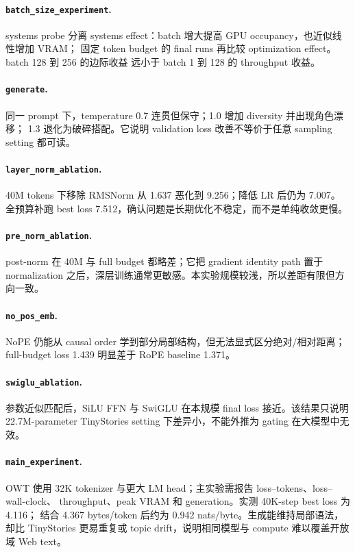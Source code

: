 \paragraph{\texttt{batch\_size\_experiment}.}
systems probe 分离 systems effect：batch 增大提高 GPU occupancy，也近似线性增加 VRAM；
固定 token budget 的 final runs 再比较 optimization effect。batch 128 到 256 的边际收益
远小于 batch 1 到 128 的 throughput 收益。

\paragraph{\texttt{generate}.}
同一 prompt 下，temperature 0.7 连贯但保守；1.0 增加 diversity 并出现角色漂移；
1.3 退化为破碎搭配。它说明 validation loss 改善不等价于任意 sampling setting 都可读。

\paragraph{\texttt{layer\_norm\_ablation}.}
40M tokens 下移除 RMSNorm 从 1.637 恶化到 9.256；降低 LR 后仍为 7.007。
全预算补跑 best loss 7.512，确认问题是长期优化不稳定，而不是单纯收敛更慢。

\paragraph{\texttt{pre\_norm\_ablation}.}
post-norm 在 40M 与 full budget 都略差；它把 gradient identity path 置于 normalization
之后，深层训练通常更敏感。本实验规模较浅，所以差距有限但方向一致。

\paragraph{\texttt{no\_pos\_emb}.}
NoPE 仍能从 causal order 学到部分局部结构，但无法显式区分绝对/相对距离；
full-budget loss 1.439 明显差于 RoPE baseline 1.371。

\paragraph{\texttt{swiglu\_ablation}.}
参数近似匹配后，SiLU FFN 与 SwiGLU 在本规模 final loss 接近。该结果只说明
22.7M-parameter TinyStories setting 下差异小，不能外推为 gating 在大模型中无效。

\paragraph{\texttt{main\_experiment}.}
OWT 使用 32K tokenizer 与更大 LM head；主实验需报告 loss--tokens、loss--wall-clock、
throughput、peak VRAM 和 generation。实测 40K-step best loss 为 4.116；
结合 4.367 bytes/token 后约为 0.942 nats/byte。生成能维持局部语法，却比 TinyStories
更易重复或 topic drift，说明相同模型与 compute 难以覆盖开放域 Web text。

